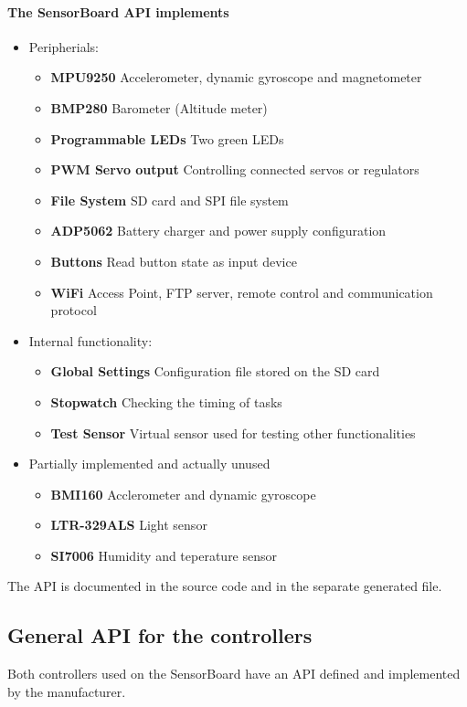 \paragraph{The SensorBoard \ac{API} implements}
\begin{itemize}
	\item Peripherials:
	\begin{itemize}
		\item \textbf{MPU9250} Accelerometer, dynamic gyroscope and magnetometer
		\item \textbf{BMP280} Barometer (Altitude meter)
		\item \textbf{Programmable LEDs} Two green LEDs
		\item \textbf{PWM Servo output} Controlling connected servos or regulators
		\item \textbf{File System} SD card and SPI file system
		\item \textbf{ADP5062} Battery charger and power supply configuration
		\item \textbf{Buttons} Read button state as input device
		\item \textbf{WiFi} Access Point, FTP server, remote control and communication protocol
	\end{itemize}
	\item Internal functionality:
	\begin{itemize}
		\item \textbf{Global Settings} Configuration file stored on the SD card
		\item \textbf{Stopwatch} Checking the timing of tasks
		\item \textbf{Test Sensor} Virtual sensor used for testing other functionalities
	\end{itemize}
	\item Partially implemented and actually unused
	\begin{itemize}
		\item \textbf{BMI160} Acclerometer and dynamic gyroscope
		\item \textbf{LTR-329ALS} Light sensor
		\item \textbf{SI7006} Humidity and teperature sensor
	\end{itemize}
\end{itemize}

The \ac{API} is documented in the source code and in the separate generated file.

\subsection{General \ac{API} for the controllers}
\label{GeneralAPI}
Both controllers used on the SensorBoard have an \ac{API} defined and implemented by the manufacturer.

